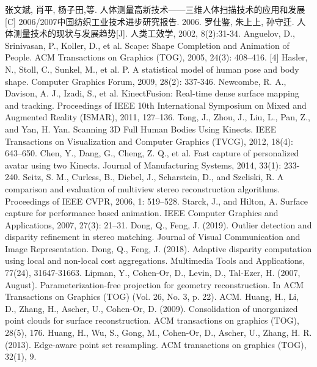 \documentclass[10pt]{article}
\begin{document}
\begin{thebibliography}{1}
 张文斌, 肖平, 杨子田,等. 人体测量高新技术——三维人体扫描技术的应用和发展[C] 2006/2007中国纺织工业技术进步研究报告. 2006.
 罗仕鉴, 朱上上, 孙守迁. 人体测量技术的现状与发展趋势[J]. 人类工效学, 2002, 8(2):31-34.
 Anguelov, D., Srinivasan, P., Koller, D., et al. Scape: Shape Completion and Animation of People. ACM Transactions on Graphics (TOG), 2005, 24(3): 408–416.
[4]	Hasler, N., Stoll, C., Sunkel, M., et al. P. A statistical model of human pose and body shape. Computer Graphics Forum, 2009, 28(2): 337-346.
	Newcombe, R. A., Davison, A. J., Izadi, S., et al. KinectFusion: Real-time dense surface mapping and tracking. Proceedings of IEEE 10th International Symposium on Mixed and Augmented Reality (ISMAR), 2011, 127–136.
	Tong, J., Zhou, J., Liu, L., Pan, Z., and Yan, H. Yan. Scanning 3D Full Human Bodies Using Kinects. IEEE Transactions on Visualization and Computer Graphics (TVCG), 2012, 18(4): 643–650.
	Chen, Y., Dang, G., Cheng, Z. Q., et al. Fast capture of personalized avatar using two Kinects. Journal of Manufacturing Systems, 2014, 33(1): 233-240.
	Seitz, S. M., Curless, B., Diebel, J., Scharstein, D., and Szeliski, R. A comparison and evaluation of multiview stereo reconstruction algorithms. Proceedings of IEEE CVPR, 2006, 1: 519–528.
	Starck, J., and Hilton, A. Surface capture for performance based animation. IEEE Computer Graphics and Applications, 2007, 27(3): 21–31.
	Dong, Q., Feng, J. (2019). Outlier detection and disparity refinement in stereo matching. Journal of Visual Communication and Image Representation.
	Dong, Q., Feng, J. (2018). Adaptive disparity computation using local and non-local cost aggregations. Multimedia Tools and Applications, 77(24), 31647-31663.
	Lipman, Y., Cohen-Or, D., Levin, D.,  Tal-Ezer, H. (2007, August). Parameterization-free projection for geometry reconstruction. In ACM Transactions on Graphics (TOG) (Vol. 26, No. 3, p. 22). ACM.
	Huang, H., Li, D., Zhang, H., Ascher, U., Cohen-Or, D. (2009). Consolidation of unorganized point clouds for surface reconstruction. ACM transactions on graphics (TOG), 28(5), 176.
	Huang, H., Wu, S., Gong, M., Cohen-Or, D., Ascher, U.,  Zhang, H. R. (2013). Edge-aware point set resampling. ACM transactions on graphics (TOG), 32(1), 9.

\end{thebibliography}
\end{document}
